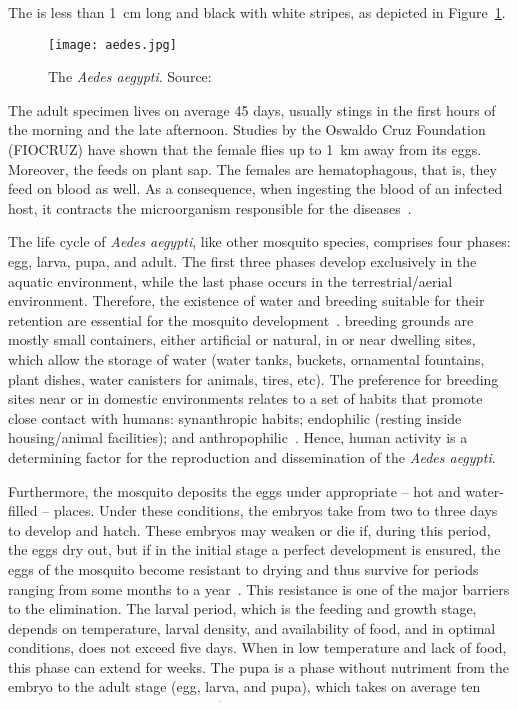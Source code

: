 The \Aedes is less than 1~cm long and black with white stripes,
as depicted in Figure~\ref{fig:aedes}.
%
%
\begin{figure}[b]
	\centering
	\texttt{[image: aedes.jpg]}
	\caption[The {\it Aedes aegypti}]{The {\it Aedes aegypti}. Source:~\cite{web:aedesfiocruz}}
	\label{fig:aedes}
\end{figure}
%
The adult specimen lives on average 45 days, usually stings in the first hours of the morning and the late afternoon.
Studies by the Oswaldo Cruz Foundation (FIOCRUZ)
have shown that the female flies up to 1~km away from its eggs.
Moreover, the \Aedes feeds on plant sap.
The females are hematophagous, that is, they feed on blood as well.
As a consequence, when ingesting the blood of an infected host, it contracts the microorganism responsible for the diseases~\cite{lambrechts2012vector}.

The life cycle of {\it Aedes aegypti}, like other mosquito species, comprises four phases: egg, larva, pupa, and adult.
The first three phases develop exclusively in the aquatic environment, while the last phase occurs in the terrestrial/aerial environment.
Therefore, the existence of water and breeding suitable for their retention are essential for the mosquito development~\cite{Jansen2010}.
\Aedes breeding grounds are mostly small containers, either artificial or natural, in or near dwelling sites, which allow the storage of water (water tanks, buckets, ornamental fountains, plant dishes, water canisters for animals, tires, etc).
The preference for breeding sites near or in domestic environments relates to a set of habits that promote close contact with humans: synanthropic habits; endophilic (resting inside housing/animal facilities); and anthropophilic~\cite{Jansen2010}.
Hence, human activity is a determining factor for the reproduction and dissemination of the \textit{Aedes aegypti}.

Furthermore, the mosquito deposits the eggs under appropriate -- hot and water-filled -- places.
Under these conditions, the embryos take from two to three days to develop and hatch.
These embryos may weaken or die if, during this period, the eggs dry out, but if in the initial stage a perfect development is ensured, the eggs of the mosquito become resistant to drying and thus survive for periods ranging from some months to a year~\cite{lambrechts2012vector}.
This resistance is one of the major barriers to the \Aedes elimination.
The larval period, which is the feeding and growth stage, depends on temperature, larval density, and availability of food, and in optimal conditions, does not exceed five days.
When in low temperature and lack of food, this phase can extend for weeks. %
The pupa is a phase without nutriment
from the embryo to the adult stage (egg, larva, and pupa), which takes on average ten days.
On the first or second day after becoming adults, mosquitoes copulate.
After mating, females begin to feed on blood since it has the necessary proteins for the development of eggs~\cite{lambrechts2012vector}.


